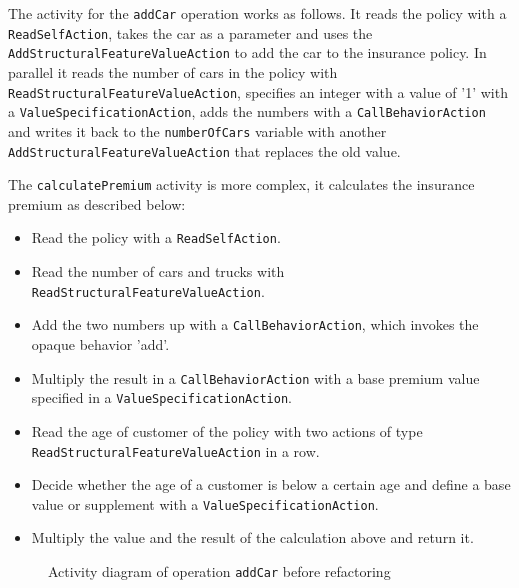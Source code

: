 \documentclass{llncs}
\begin{document}
The activity for the \texttt{addCar} operation works as follows. It reads the policy with a \texttt{Read\-Self\-Action}, takes the 
car as a parameter and uses the \texttt{Add\-Structural\-Feature\-Value\-Action} to add the car to the insurance policy. In parallel 
it reads the number of cars in the policy with \texttt{Read\-Structural\-Feature\-Value\-Action}, specifies an integer
with a value of '1' with 
a \texttt{Value\-Specification\-Action}, adds the numbers with a \texttt{Call\-Behavior\-Action} and writes it back to the 
\texttt{numberOfCars} variable with another \texttt{Add\-Structural\-Feature\-Value\-Action} that replaces the old value.

The \texttt{calculatePremium} activity is more complex, it calculates the insurance premium as described below:

\begin{itemize}
 \item Read the policy with a \texttt{Read\-Self\-Action}.
 \item Read the number of cars and trucks with \texttt{Read\-Structural\-Feature\-Value\-Action}.
 \item Add the two numbers up with a \texttt{Call\-Behavior\-Action}, which invokes the opaque behavior 'add'.
 \item Multiply the result in a \texttt{Call\-Behavior\-Action} with a base premium value specified in a \texttt{Value\-Specification\-Action}.
 \item Read the age of customer of the policy with two actions of type \texttt{Read\-Structural\-Feature\-Value\-Action} in a row.
 \item Decide whether the age of a customer is below a certain age and define a base value or supplement with a \texttt{Value\-Specification\-Action}.
 \item Multiply the value and the result of the calculation above and return it.
\end{itemize}

\begin{figure}[h!t]
 \centering
{}
 \caption{Activity diagram of operation \texttt{addCar} before refactoring}
 \label{fig:addCar}
\end{figure}
\end{document}
